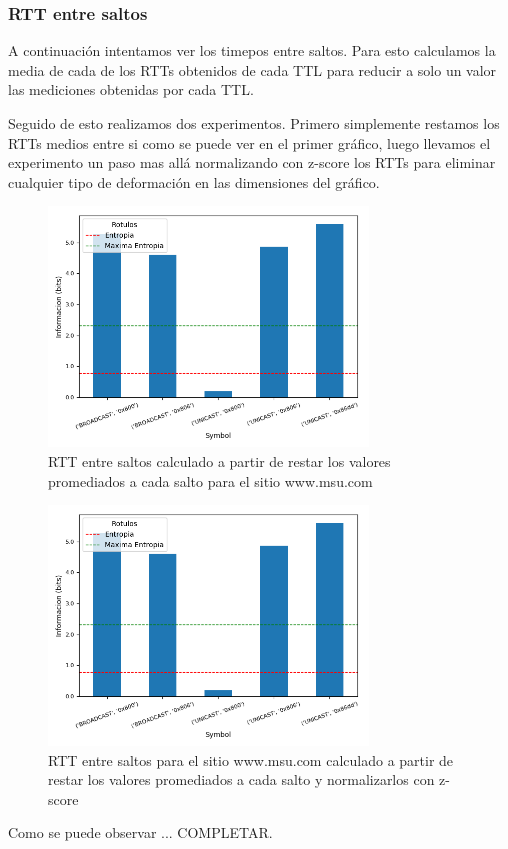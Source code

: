 \subsubsection*{RTT entre saltos}

A continuación intentamos ver los timepos entre saltos. Para esto calculamos la media de cada de los RTTs obtenidos de cada TTL para reducir a solo un valor las mediciones obtenidas por cada TTL. 

Seguido de esto realizamos dos experimentos. Primero simplemente restamos los RTTs medios entre si como se puede ver en el primer gráfico, luego llevamos el experimento un paso mas allá normalizando con z-score los RTTs para eliminar cualquier tipo de deformación en las dimensiones del gráfico.

\begin{figure}[H]
  \centering
  \includegraphics[width=8.5cm]{figs/information_hogar_ethernet_S1_output.png}
  \caption{\normalfont RTT entre saltos calculado a partir de restar los valores promediados a cada salto para el sitio www.msu.com}
\end{figure}

\begin{figure}[H]
  \centering
  \includegraphics[width=8.5cm]{figs/information_hogar_ethernet_S1_output.png}
  \caption{\normalfont RTT entre saltos para el sitio www.msu.com calculado a partir de restar los valores promediados a cada salto y normalizarlos con z-score}
\end{figure}

Como se puede observar ... COMPLETAR.